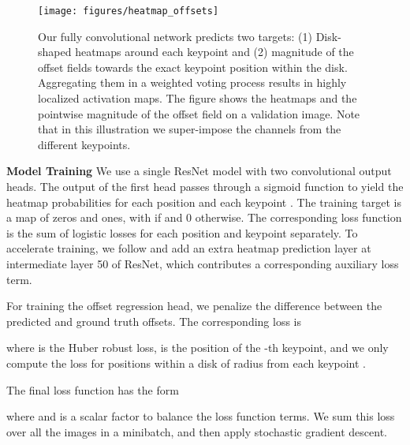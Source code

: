 \documentclass[10pt,twocolumn,letterpaper]{article}
\newcommand{\eat}[1]{}
\begin{document}
\begin{figure}
\centering
\texttt{[image: figures/heatmap\_offsets]}
\caption{\label{fig:heatmap_offsets}
Our fully convolutional network predicts two targets: (1) Disk-shaped heatmaps around each keypoint and (2) magnitude of the offset fields towards the exact keypoint position within the disk. Aggregating them in a weighted voting process results in highly localized activation maps. The figure shows the heatmaps and the pointwise magnitude of the offset field on a validation image. Note that in this illustration we super-impose the channels from the different keypoints.
}
\end{figure}

\textbf{Model Training}
We use a single ResNet model with two convolutional output heads. The output of the first head passes through a sigmoid function to yield the heatmap probabilities  for each position  and each keypoint . The training target  is a map of zeros and ones, with  if  and 0 otherwise. The corresponding loss function  is the sum of logistic losses for each position and keypoint separately.
To accelerate training, we follow \cite{deeper_cut} and add an extra heatmap prediction layer at  intermediate layer 50 of ResNet, which contributes a corresponding auxiliary loss term.

\eat{
To train the heatmap head, we use the following per-anchor cross entropy loss function:

where  is the true location of keypoint ,
and  encodes the true location
using a heatmap with a disk of radius 
centered on the true location.
If the keypoint is not visible, then  for all locations ,
so the model will be encouraged not to hallucinate invisible joints.
(In some settings, we might want the model to perform amodal completion,
but that is beyond the scope of this paper.)
}

For training the offset regression head, we penalize the difference between the predicted and ground truth offsets. The corresponding loss is

where  is the Huber robust loss,  is the position of the -th keypoint, and we only compute the loss for positions  within a disk of radius  from each keypoint \cite{Ren2015}.

The final loss function has the form

where  and  is a scalar factor to balance the loss function terms. We sum this loss over all the images in a minibatch, and then apply stochastic gradient descent.
\end{document}
